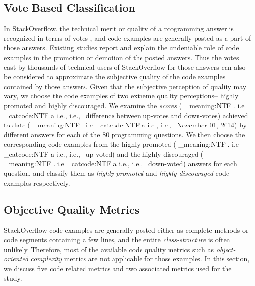 \documentclass[conference]{IEEEtran}
\makeatletter
\newcommand\latinabbrev[1]{
  \peek_meaning:NTF . {%
    #1\@}%
  { \peek_catcode:NTF a {%
      #1., \@ }%
    {#1., \@}}}
\def\eg{\latinabbrev{e.g}}
\def\ie{\latinabbrev{i.e}}
\makeatother
\begin{document}
\subsection{Vote Based Classification}\label{sec:voteclass}
In StackOverflow, the technical merit or quality of a programming answer is recognized in terms of votes \cite{nasehi}, and code examples are generally posted as a part of those answers. Existing studies \cite{nasehi, nier} report and explain the undeniable role of code examples in the promotion or demotion of the posted answers. Thus the votes cast by thousands of technical users of StackOverflow for those answers can also be considered to approximate the subjective quality of the code examples contained by those answers. Given that the subjective perception of quality may vary, we choose the code examples of two extreme quality perceptions-- highly promoted and highly discouraged. We examine the \emph{scores} (\ie\ difference between up-votes and down-votes) 
achieved to date (\ie\ November 01, 2014) by different answers for each of the 80 programming questions. We then choose the corresponding code examples from the highly promoted (\ie\ up-voted) and the highly discouraged (\ie\ down-voted) answers for each question, and classify them as \emph{highly promoted} and \emph{highly discouraged} code examples respectively.
\vspace{-.1cm}
\subsection{Objective Quality Metrics}
\label{sec:metrics}
StackOverflow code examples are generally posted either as complete methods or code segments containing a few lines, and the entire \emph{class-structure} is often unlikely. Therefore, most of the available code quality metrics such as \emph{object-oriented complexity} metrics are not applicable for those examples. In this section, we discuss five code related metrics and two associated metrics used for the study. 
\end{document}
